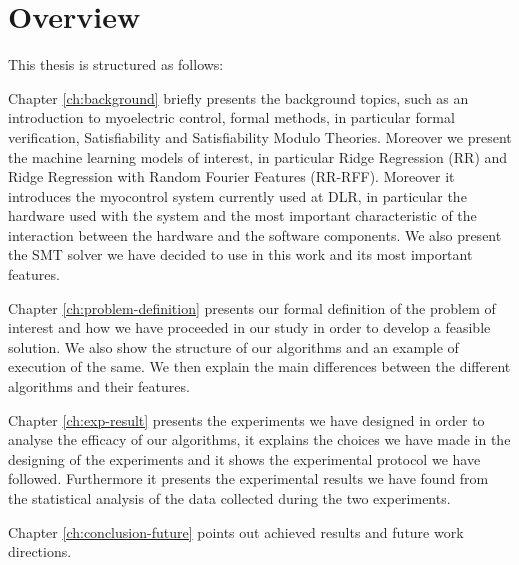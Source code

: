 \section{Overview}\label{sec:overview}
This thesis is structured as follows:

Chapter \ref{ch:background} briefly presents the background topics, such as an introduction to myoelectric control, formal methods, in particular formal verification, Satisfiability and Satisfiability Modulo Theories. Moreover we present the machine learning models of interest, in particular Ridge Regression (RR) and Ridge Regression with Random Fourier Features (RR-RFF).
Moreover it introduces the myocontrol system currently used at DLR, in particular the hardware used with the system and the most important characteristic of the interaction between the hardware and the software components. We also present the SMT solver we have decided to use in this work and its most important features.

Chapter \ref{ch:problem-definition} presents our formal definition of the problem of interest and how we have proceeded in our study in order to develop a feasible solution. We also show the structure of our algorithms and an example of execution of the same. We then explain the main differences between the different algorithms and their features.

Chapter \ref{ch:exp-result} presents the experiments we have designed in order to analyse the efficacy of our algorithms, it explains the choices we have made in the designing of the experiments and it shows the experimental protocol we have followed. Furthermore it presents the experimental results we have found from the statistical analysis of the data collected during the two experiments. 

Chapter \ref{ch:conclusion-future}  points out achieved results and future work directions.